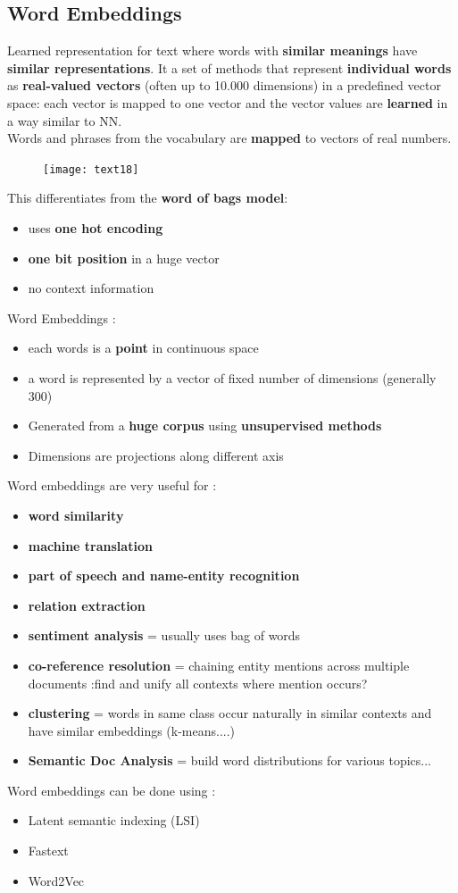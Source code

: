 \subsection{Word Embeddings}
Learned representation for text where words with \textbf{similar meanings} have \textbf{similar representations}. It a set of methods that represent \textbf{individual words} as \textbf{real-valued vectors} (often up to 10.000 dimensions) in a predefined vector space: each vector is mapped to one vector and the vector values are \textbf{learned} in a way similar to NN.
\\
Words and phrases from the vocabulary are \textbf{mapped}  to vectors of real numbers.
 \begin{figure}[H]
  \centering
  \texttt{[image: text18]}
\end{figure}
This differentiates from the \textbf{word of bags model}:
\begin{itemize}
\item uses \textbf{one hot encoding}
\item \textbf{one bit position} in a huge vector
\item no context information
\end{itemize}
Word Embeddings :
\begin{itemize}
\item each words is a \textbf{point} in continuous space
\item a word is represented by a vector of fixed number of dimensions (generally 300)
\item Generated from a \textbf{huge corpus} using \textbf{unsupervised methods}
\item Dimensions are projections	along different axis 
\end{itemize}
Word embeddings are very useful for :
\begin{itemize}
\item \textbf{word similarity} 
\item\textbf{ machine translation}
\item \textbf{part of speech and name-entity recognition}
\item \textbf{relation extraction}
\item \textbf{sentiment analysis} = usually uses bag of words
\item \textbf{co-reference resolution} = chaining entity mentions across multiple documents :find and unify all contexts where mention occurs?
\item \textbf{clustering} = words in same class occur naturally in similar contexts and have similar embeddings (k-means....)
\item \textbf{Semantic Doc Analysis} = build word distributions for various topics...
\end{itemize}
Word embeddings can be done using :
\begin{itemize}
\item Latent semantic indexing (LSI)
\item Fastext
\item Word2Vec
\end{itemize}

